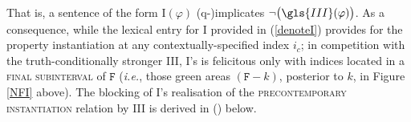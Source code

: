 That is, a sentence of the form \gls{I}$ (\varphi) $ ({\sc q}-)implicates $ \neg\big(\gls{III}(\varphi)\big) $. As a consequence, while the lexical entry for \gls{I} provided in (\ref{denoteI}) provides for the property instantiation at any contextually-specified index $ i_c $; in competition with the truth-conditionally stronger \gls{III}, \gls{I}'s is felicitous only with indices located in a \textsc{final subinterval} of $ \mathtt{F} $ (\textit{i.e.}, those green areas $ (\texttt{F}-k) $, posterior to $ k $, in Figure \ref{NFI} above). The blocking of \gls{I}'s realisation of the \textsc{precontemporary instantiation} relation by \gls{III} is derived in (\nextx) below.
%
%
%
%


